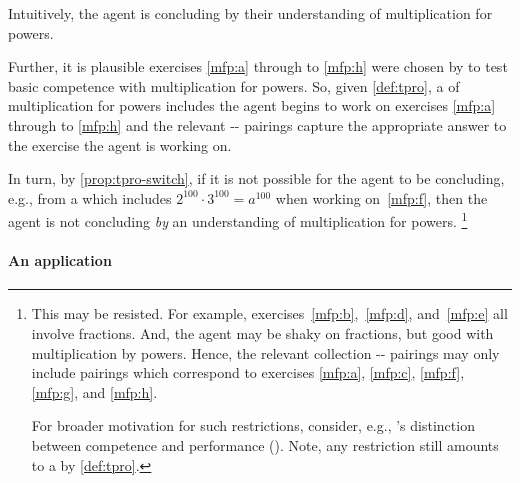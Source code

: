 \begin{note}
  \noindent%
  Intuitively, the agent is concluding by their understanding of multiplication for powers.

  Further, it is plausible exercises \ref{mfp:a} through to \ref{mfp:h} were chosen by \citeauthor{Gelfand:1993aa} to test basic competence with multiplication for powers.
  So, given \autoref{def:tpro}, a \tpro{} \tproS{} of multiplication for powers includes  the agent begins to work on exercises \ref{mfp:a} through to \ref{mfp:h} and the relevant -- pairings capture the appropriate answer to the exercise the agent is working on.

  In turn, by \autoref{prop:tpro-switch}, if it is not possible for the agent to be concluding, e.g.,  from a \pool{} which includes \(2^{100} \cdot 3^{100} = a^{100}\) when working on~\ref{mfp:f}, then the agent is not concluding \emph{by} an understanding of multiplication for powers.%
  \footnote{
    This may be resisted.
    For example, exercises~\ref{mfp:b},~\ref{mfp:d}, and~\ref{mfp:e} all involve fractions.
    And, the agent may be shaky on fractions, but good with multiplication by powers.
    Hence, the relevant collection -- pairings may only include pairings which correspond to exercises \ref{mfp:a}, \ref{mfp:c}, \ref{mfp:f}, \ref{mfp:g}, and \ref{mfp:h}.

    For broader motivation for such restrictions, consider, e.g., \citeauthor{Chomsky:2015aa}'s distinction between competence and performance    (\citeyear[xii]{Chomsky:2015aa}).
    Note, any restriction still amounts to a \tpro{} by \autoref{def:tpro}.
  }
\end{note}



\paragraph*{An application}


